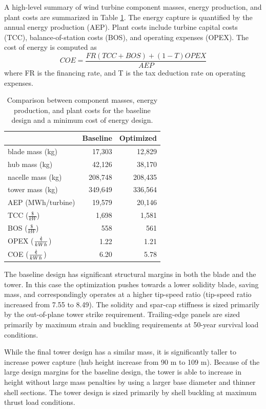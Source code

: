 \documentclass[]{aiaa-tc} %
\newcommand{\cent}{{\mathrm{c}\mkern-6.5mu{\mid}}}
\begin{document}
    A high-level summary of wind turbine component masses, energy production, and plant costs are summarized in Table \ref{tab:wind_results}.  The energy capture is quantified by the annual energy production (AEP).  Plant costs include turbine capital costs (TCC), balance-of-station costs (BOS), and operating expenses (OPEX).  The cost of energy is computed as
    \begin{equation}
    COE = \frac {FR (TCC + BOS) + (1-T) OPEX} {AEP}
    \end{equation}
    where FR is the financing rate, and T is the tax deduction rate on operating expenses.

    \begin{table}[htb]
    \centering
    \caption{Comparison between component masses, energy production, and plant costs for the baseline design and a minimum cost of energy design.}
    \label{tab:wind_results}
    \begin{tabular}{@{}lrr@{}}
    \toprule
     &  Baseline & Optimized  \\
    \midrule
    blade mass (kg) & 17,303 & 12,829  \\
    hub mass (kg) & 42,126 & 38,170  \\
    nacelle mass (kg) & 208,748 & 208,435  \\
    tower mass (kg) & 349,649 & 336,564  \\
    AEP (MWh/turbine) &  19,579 & 20,146  \\
    TCC ($\frac{\$}{kW}$) &  1,698 & 1,581  \\
    BOS ($\frac{\$}{kW}$) &  558 & 561  \\
    OPEX ($\frac{\cent}{kWh}$) &  1.22 & 1.21  \\
    COE ($\frac{\cent}{kWh}$) &  6.20 & 5.78  \\
    \bottomrule
    \end{tabular}
    \end{table}

      The baseline design has significant structural margins in both the blade and the tower.  In this case the optimization pushes towards a lower solidity blade, saving mass, and correspondingly operates at a higher tip-speed ratio (tip-speed ratio increased from 7.55 to 8.49).  The solidity and spar-cap stiffness is sized primarily by the out-of-plane tower strike requirement.  Trailing-edge panels are sized primarily by maximum strain and buckling requirements at 50-year survival load conditions.

      While the final tower design has a similar mass, it is significantly taller to increase power capture (hub height increase from 90 m to 109 m).  Because of the large design margins for the baseline design, the tower is able to increase in height without large mass penalties by using a larger base diameter and thinner shell sections.  The tower design is sized primarily by shell buckling at maximum thrust load conditions.
\end{document}
